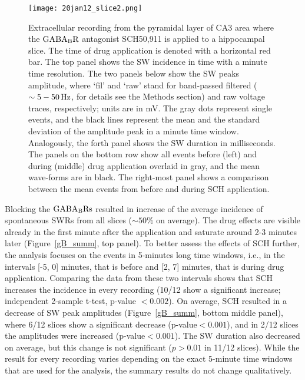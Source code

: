     \begin{figure}
      \center
      \texttt{[image: 20jan12\_slice2.png]}
      \caption{ 
        Extracellular recording from the pyramidal layer of CA3 area where the
        $\rm GABA_B R$ antagonist SCH50,911 is applied to a hippocampal slice.
        The time of drug application is denoted with a horizontal red bar. The
        top panel shows the SW incidence in time with a minute time resolution.
        The two panels below show the SW peaks amplitude, where `fil' and `raw'
        stand for band-passed filtered ($\sim 5-50\, \rm Hz$, for details see
        the Methods section) and raw voltage traces, respectively; units are in
        mV. The gray dots represent single events, and the black lines
        represent the mean and the standard deviation of the amplitude peak in
        a minute time window. Analogously, the forth panel shows the SW
        duration in milliseconds. The panels on the bottom row show all events
        before (left) and during (middle) drug application overlaid in gray,
        and the mean wave-forms are in black. The right-most panel shows a
        comparison between the mean events from before and during SCH
        application.
              }
    \label{fig:gB_example}
    \end{figure}

    Blocking the $\rm GABA_B Rs$ resulted in increase of the average incidence
    of spontaneous SWRs from all slices ($\sim 50\%$ on average). The drug
    effects are visible already in the first minute after the application and
    saturate around 2-3 minutes later (Figure~\ref{gB_summ}, top panel). To
    better assess the effects of SCH further, the analysis focuses on the
    events in 5-minutes long time windows, i.e., in the intervals [-5, 0]
    minutes, that is before and [2, 7] minutes, that is during drug
    application. Comparing the data from these two intervals shows that SCH
    increases the incidence in every recording (10/12 show a significant
    increase; independent 2-sample t-test, p-value $<0.002$). On average, SCH
    resulted in a decrease of SW peak amplitudes (Figure~\ref{gB_summ}, bottom
    middle panel), where 6/12 slices show a significant decrease
    (p-value$<0.001$), and in 2/12 slices the amplitudes were increased
    (p-value$<0.001$). The SW duration also decreased on average, but this
    change is not significant ($p>0.01$ in 11/12 slices). While the result for
    every recording varies depending on the exact 5-minute time windows that
    are used for the analysis, the summary results do not change qualitatively.
    
